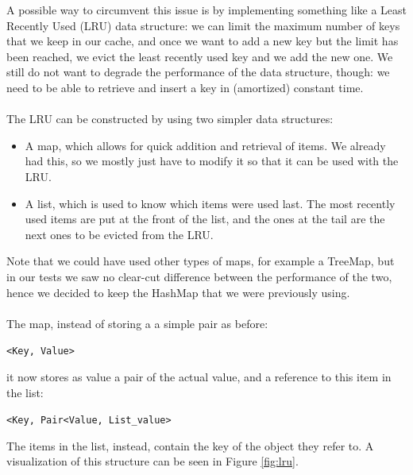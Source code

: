 A possible way to circumvent this issue is by implementing something like a Least Recently Used (LRU) data structure: we can limit the maximum number of keys that we keep in our cache, and once we want to add a new key but the limit has been reached, we evict the least recently used key and we add the new one. We still do not want to degrade the performance of the data structure, though: we need to be able to retrieve and insert a key in (amortized) constant time.
\\\\
The LRU can be constructed by using two simpler data structures:
\begin{itemize}  
  \item A map, which allows for quick addition and retrieval of items. We already had this, so we mostly just have to modify it so that it can be used with the LRU.
  \item A list, which is used to know which items were used last. The most recently used items are put at the front of the list, and the ones at the tail are the next ones to be evicted from the LRU.
\end{itemize}
Note that we could have used other types of maps, for example a TreeMap, but in our tests we saw no clear-cut difference between the performance of the two, hence we decided to keep the HashMap that we were previously using.
\\\\
The map, instead of storing a a simple pair as before:
\begin{center}
  \texttt{<Key, Value>}
\end{center}
it now stores as value a pair of the actual value, and a reference to this item in the list:
\begin{center}
  \texttt{<Key, Pair<Value, List\_value>}
\end{center}
The items in the list, instead, contain the key of the object they refer to. A visualization of this structure can be seen in Figure \ref{fig:lru}.

